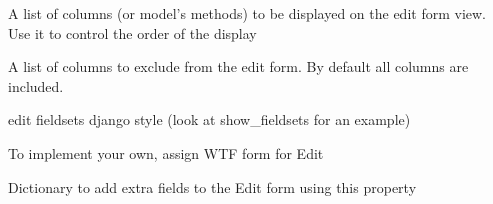\documentclass[letterpaper,10pt,english]{sphinxmanual}
\begin{document}
\begin{fulllineitems}
\begin{fulllineitems}
\label{api:flask.ext.appbuilder.baseviews.BaseCRUDView.edit_columns}
A list of columns (or model's methods) to be displayed on the edit form view.
Use it to control the order of the display

\end{fulllineitems}


\begin{fulllineitems}
\label{api:flask.ext.appbuilder.baseviews.BaseCRUDView.edit_exclude_columns}
A list of columns to exclude from the edit form. By default all columns are included.

\end{fulllineitems}


\begin{fulllineitems}
\label{api:flask.ext.appbuilder.baseviews.BaseCRUDView.edit_fieldsets}
edit fieldsets django style (look at show\_fieldsets for an example)

\end{fulllineitems}


\begin{fulllineitems}
\label{api:flask.ext.appbuilder.baseviews.BaseCRUDView.edit_form}
To implement your own, assign WTF form for Edit

\end{fulllineitems}


\begin{fulllineitems}
\label{api:flask.ext.appbuilder.baseviews.BaseCRUDView.edit_form_extra_fields}
Dictionary to add extra fields to the Edit form using this property

\end{fulllineitems}


\end{fulllineitems}
\end{document}
